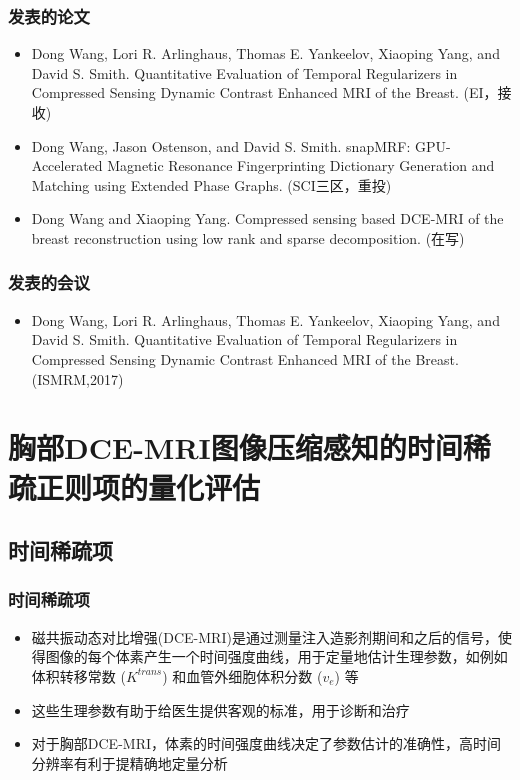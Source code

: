 \documentclass{beamer}
\begin{document}
\begin{frame}
	\frametitle{发表的论文}
	\begin{itemize}
		\item Dong Wang, Lori R. Arlinghaus, Thomas E. Yankeelov, Xiaoping Yang, and David S. Smith. Quantitative Evaluation of Temporal Regularizers in Compressed Sensing Dynamic Contrast Enhanced MRI of the Breast. (EI，接收)
		\item Dong Wang, Jason Ostenson, and David S. Smith. snapMRF: GPU-Accelerated Magnetic Resonance Fingerprinting Dictionary Generation and Matching using Extended Phase Graphs. (SCI三区，重投)
		\item Dong Wang and Xiaoping Yang. Compressed sensing based DCE-MRI of the breast reconstruction using low rank and sparse decomposition. (在写)
	\end{itemize}
\end{frame}

\begin{frame}
	\frametitle{发表的会议}
	\begin{itemize}
		\item Dong Wang, Lori R. Arlinghaus, Thomas E. Yankeelov, Xiaoping Yang, and David S. Smith. Quantitative Evaluation of Temporal Regularizers in Compressed Sensing Dynamic Contrast Enhanced MRI of the Breast.(ISMRM,2017)
	\end{itemize}
\end{frame}



\section{胸部DCE-MRI图像压缩感知的时间稀疏正则项的量化评估}

\subsection{时间稀疏项}
\begin{frame}
	\frametitle{时间稀疏项}
	\begin{itemize}
		\item 磁共振动态对比增强(DCE-MRI)是通过测量注入造影剂期间和之后的信号，使得图像的每个体素产生一个时间强度曲线，用于定量地估计生理参数，如例如体积转移常数 ($K^{trans}$) 和血管外细胞体积分数 ($v_e$) 等
		\item 这些生理参数有助于给医生提供客观的标准，用于诊断和治疗
		\item 对于胸部DCE-MRI，体素的时间强度曲线决定了参数估计的准确性，高时间分辨率有利于提精确地定量分析
	\end{itemize}
\end{frame}
\end{document}

